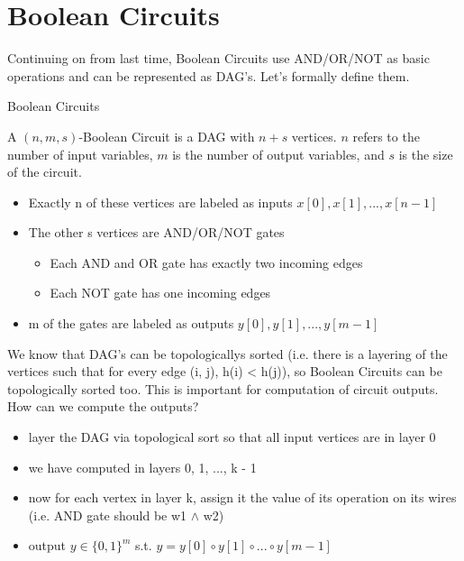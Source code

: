 \chapter{Boolean Circuits}

Continuing on from last time, Boolean Circuits use AND/OR/NOT as basic operations and can be represented as DAG's. Let's formally define them.

\begin{definition}
    Boolean Circuits

    A $(n, m, s)$-Boolean Circuit is a DAG with $n + s$ vertices. $n$ refers to the number of input variables, $m$ is the number of output variables, and $s$ is the size of the circuit.
    \begin{itemize}
        \item Exactly n of these vertices are labeled as inputs $x[0], x[1], ..., x[n-1]$
        \item The other s vertices are AND/OR/NOT gates
        \begin{itemize}
            \item Each AND and OR gate has exactly two incoming edges
            \item Each NOT gate has one incoming edges
        \end{itemize}
        \item m of the gates are labeled as outputs $y[0], y[1], ..., y[m - 1]$
    \end{itemize}
    \begin{center}
    \end{center}
\end{definition}

We know that DAG's can be topologicallys sorted (i.e. there is a layering of the vertices such that for every edge (i, j), h(i) < h(j)), so Boolean Circuits can be topologically sorted too. This is important for computation of circuit outputs. How can we compute the outputs?
\begin{itemize}
    \item layer the DAG via topological sort so that all input vertices are in layer 0
    \item we have computed in layers 0, 1, ..., k - 1
    \item now for each vertex in layer k, assign it the value of its operation on its wires (i.e. AND gate should be w1 $\land$ w2)
    \item output $y \in \{0,1\}^m$ s.t. $y = y[0] \circ y[1] \circ ... \circ y[m-1]$
\end{itemize}

